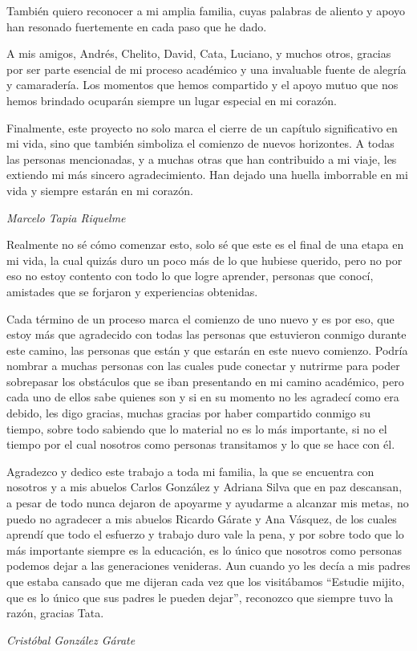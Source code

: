 También quiero reconocer a mi amplia familia, cuyas palabras de aliento y apoyo han resonado fuertemente en cada paso que he dado.

A mis amigos, Andrés, Chelito, David, Cata, Luciano, y muchos otros, gracias por ser parte esencial de mi proceso académico y una invaluable fuente de alegría y camaradería. Los momentos que hemos compartido y el apoyo mutuo que nos hemos brindado ocuparán siempre un lugar especial en mi corazón.

Finalmente, este proyecto no solo marca el cierre de un capítulo significativo en mi vida, sino que también simboliza el comienzo de nuevos horizontes. A todas las personas mencionadas, y a muchas otras que han contribuido a mi viaje, les extiendo mi más sincero agradecimiento. Han dejado una huella imborrable en mi vida y siempre estarán en mi corazón.

\textit{Marcelo Tapia Riquelme}

\newpage
Realmente no sé cómo comenzar esto, solo sé que este es el final de una etapa en mi vida, la cual quizás duro un poco más de lo que hubiese querido, pero no por eso no estoy contento con todo lo que logre aprender, personas que conocí, amistades que se forjaron y experiencias obtenidas.

Cada término de un proceso marca el comienzo de uno nuevo y es por eso, que estoy más que agradecido con todas las personas que estuvieron conmigo durante este camino, las personas que están y que estarán en este nuevo comienzo. Podría nombrar a muchas personas con las cuales pude conectar y nutrirme para poder sobrepasar los obstáculos que se iban presentando en mi camino académico, pero cada uno de ellos sabe quienes son y si en su momento no les agradecí como era debido, les digo gracias, muchas gracias por haber compartido conmigo su tiempo, sobre todo sabiendo que lo material no es lo más importante, si no el tiempo por el cual nosotros como personas transitamos y lo que se hace con él.

Agradezco y dedico este trabajo a toda mi familia, la que se encuentra con nosotros y a mis abuelos Carlos González y Adriana Silva que en paz descansan, a pesar de todo nunca dejaron de apoyarme y ayudarme a alcanzar mis metas, no puedo no agradecer a mis abuelos Ricardo Gárate y Ana Vásquez, de los cuales aprendí que todo el esfuerzo y trabajo duro vale la pena, y por sobre todo que lo más importante siempre es la educación, es lo único que nosotros como personas podemos dejar a las generaciones venideras. Aun cuando yo les decía a mis padres que estaba cansado que me dijeran cada vez que los visitábamos “Estudie mijito, que es lo único que sus padres le pueden dejar”, reconozco que siempre tuvo la razón, gracias Tata.

\textit{Cristóbal González Gárate}